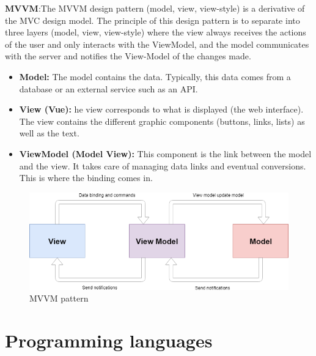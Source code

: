 \documentclass[12pt,a4paper]{report}
\begin{document}
\textbf{MVVM}:The MVVM design pattern (model, view, view-style) is a derivative of the MVC design model. The principle of this design pattern is to separate into three layers (model, view, view-style) where the view always receives the actions of the user and only interacts with the ViewModel, and the model communicates with the server and notifies the View-Model of the changes made.\cite{Mvvm} \par 
\begin{itemize}
	\item \textbf{Model:} The model contains the data. Typically, this data comes from a database or an external service such as an API.
	\item \textbf{View (Vue):} he view corresponds to what is displayed (the web interface). The view contains the different graphic components (buttons, links, lists) as well as the text.
	\item \textbf{ViewModel (Model View):}  This component is the link between the model and the view. It takes care of managing data links and eventual conversions. This is where the binding comes in.
\end{itemize}
\begin{figure}[H]
	\centering
	\includegraphics[width=6in,keepaspectratio]{mvvm-pettern.png}
	\caption{MVVM pattern}
	\label{mvvm}
\end{figure}

	
	\section{Programming languages}
\end{document}

